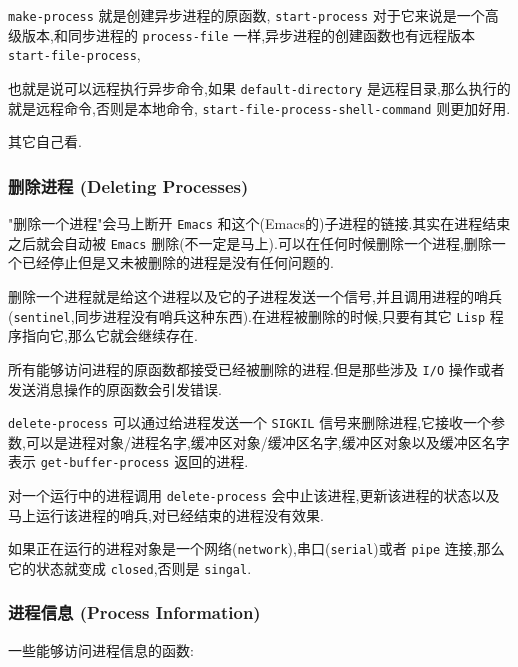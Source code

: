 \documentclass[11pt]{article}
\begin{document}
\texttt{make-process} 就是创建异步进程的原函数, \texttt{start-process} 对于它来说是一个高级版本,和同步进程的 \texttt{process-file} 一样,异步进程的创建函数也有远程版本 \texttt{start-file-process},

也就是说可以远程执行异步命令,如果 \texttt{default-directory} 是远程目录,那么执行的就是远程命令,否则是本地命令, \texttt{start-file-process-shell-command} 则更加好用.

其它自己看.



\subsubsection{删除进程 (Deleting Processes)}
\label{sec:org8463bef}

"删除一个进程"会马上断开 \texttt{Emacs} 和这个(Emacs的)子进程的链接.其实在进程结束之后就会自动被 \texttt{Emacs} 删除(不一定是马上).可以在任何时候删除一个进程,删除一个已经停止但是又未被删除的进程是没有任何问题的.

删除一个进程就是给这个进程以及它的子进程发送一个信号,并且调用进程的哨兵(\texttt{sentinel},同步进程没有哨兵这种东西).在进程被删除的时候,只要有其它 \texttt{Lisp} 程序指向它,那么它就会继续存在.

所有能够访问进程的原函数都接受已经被删除的进程.但是那些涉及 \texttt{I/O} 操作或者发送消息操作的原函数会引发错误.

\texttt{delete-process} 可以通过给进程发送一个 \texttt{SIGKIL} 信号来删除进程,它接收一个参数,可以是进程对象/进程名字,缓冲区对象/缓冲区名字,缓冲区对象以及缓冲区名字表示 \texttt{get-buffer-process} 返回的进程.

对一个运行中的进程调用 \texttt{delete-process} 会中止该进程,更新该进程的状态以及马上运行该进程的哨兵,对已经结束的进程没有效果.

如果正在运行的进程对象是一个网络(\texttt{network}),串口(\texttt{serial})或者 \texttt{pipe} 连接,那么它的状态就变成 \texttt{closed},否则是 \texttt{singal}.



\subsubsection{进程信息 (Process Information)}
\label{sec:org05a926c}

一些能够访问进程信息的函数:
\end{document}

